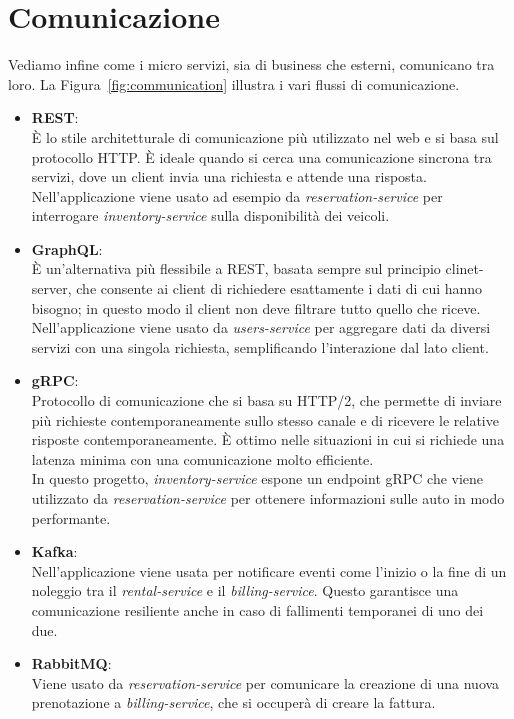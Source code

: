 \section{Comunicazione}
Vediamo infine come i micro servizi, sia di business che esterni, comunicano tra loro. La Figura~\ref{fig:communication} illustra i vari flussi di comunicazione.
\begin{itemize}
    \item \textbf{REST}: \\
        È lo stile architetturale di comunicazione più utilizzato nel web e si basa sul protocollo HTTP. È ideale quando si cerca una comunicazione sincrona tra servizi, dove un client invia una richiesta e attende una risposta. \\
        Nell'applicazione viene usato ad esempio da \textit{reservation-service} per interrogare \textit{inventory-service} sulla disponibilità dei veicoli.
    \item \textbf{GraphQL}: \\
        È un'alternativa più flessibile a REST, basata sempre sul principio clinet-server, che consente ai client di richiedere esattamente i dati di cui hanno bisogno; in questo modo il client non deve filtrare tutto quello che riceve. \\
        Nell'applicazione viene usato da \textit{users-service} per aggregare dati da diversi servizi con una singola richiesta, semplificando l'interazione dal lato client.
    \item \textbf{gRPC}: \\
        Protocollo di comunicazione che si basa su HTTP/2, che permette di inviare più richieste contemporaneamente sullo stesso canale e di ricevere le relative risposte contemporaneamente. È ottimo nelle situazioni in cui si richiede una latenza minima con una comunicazione molto efficiente. \\
        In questo progetto, \textit{inventory-service} espone un endpoint gRPC che viene utilizzato da \textit{reservation-service} per ottenere informazioni sulle auto in modo performante.
    \item \textbf{Kafka}: \\
        Nell'applicazione viene usata per notificare eventi come l'inizio o la fine di un noleggio tra il \textit{rental-service} e il \textit{billing-service}. Questo garantisce una comunicazione resiliente anche in caso di fallimenti temporanei di uno dei due.
    \item \textbf{RabbitMQ}: \\
        Viene usato da \textit{reservation-service} per comunicare la creazione di una nuova prenotazione a \textit{billing-service}, che si occuperà di creare la fattura.
\end{itemize}

